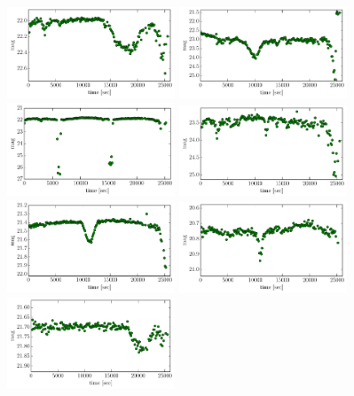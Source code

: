 \documentclass[iop, apj]{emulateapj}
\newcommand{\?}{\stackrel{?}{=}}
\begin{document}
\begin{figure}[htbp]
\includegraphics[width=5cm,clip,angle=90]{pic/eclipse/cand_14.pdf}
\includegraphics[width=5cm,clip,angle=90]{pic/eclipse/cand_15.pdf}
\includegraphics[width=5cm,clip,angle=90]{pic/eclipse/cand_16.pdf}
\includegraphics[width=5cm,clip,angle=90]{pic/eclipse/cand_17.pdf}
\includegraphics[width=5cm,clip,angle=90]{pic/eclipse/cand_18.pdf}
\includegraphics[width=5cm,clip,angle=90]{pic/eclipse/cand_19.pdf}
\includegraphics[width=5cm,clip,angle=90]{pic/eclipse/cand_20.pdf}

\end{figure}
\end{document}
